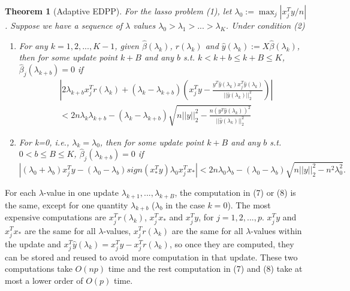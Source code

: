 \documentclass{article}
\newtheorem{theorem}{Theorem}[section]
\begin{document}
\begin{theorem}[Adaptive EDPP]
    For the lasso problem (1), let $\lambda_0:=\max_j|x_j^Ty/n|$. Suppose we have a sequence of $\lambda$ values $\lambda_0>\lambda_1>...>\lambda_K$. Under condition (2)
    \begin{enumerate}
        \item For any $k=1,2,...,K-1$, given $\hat{\beta}(\lambda_k)$, $r(\lambda_k)$ and $\hat{y}(\lambda_k):=X\hat{\beta}(\lambda_k)$, then for some update point $k+B$ and any $b$ s.t. $k<k+b\leq k+B\leq K$, $\hat{\beta}_j(\lambda_{k+b})=0$ if
        \begin{equation}
            \begin{split}
                &\left|2\lambda_{k+b}x_j^Tr(\lambda_k)+(\lambda_k-\lambda_{k+b})\left( x_j^Ty-\frac{y^T\hat{y}(\lambda_k)x_j^T\hat{y}(\lambda_k)}{||\hat{y}(\lambda_k)||_2^2}\right)\right|\\&<2n\lambda_k\lambda_{k+b}-(\lambda_k-\lambda_{k+b})\sqrt{n||y||_2^2-\frac{n(y^T\hat{y}(\lambda_k))^2}{||\hat{y}(\lambda_k)||_2^2}}
            \end{split}
        \end{equation}
        \item For k=0, i.e., $\lambda_k=\lambda_0$, then for some update point $k+B$ and any $b$ s.t. $0<b\leq B\leq K$, $\hat{\beta}_j(\lambda_{k+b})=0$ if
        \begin{equation}
        |(\lambda_0+\lambda_b)x_j^Ty-(\lambda_0-\lambda_b)sign(x_*^Ty)\lambda_0x_j^Tx_*|<2n\lambda_0\lambda_b-(\lambda_0-\lambda_b)\sqrt{n||y||_2^2-n^2\lambda_0^2}.
    \end{equation}
    \end{enumerate}
\end{theorem}

For each $\lambda$-value in one update $\lambda_{k+1},...,\lambda_{k+B}$, the computation in (7) or (8) is the same, except for one quantity $\lambda_{k+b}$ ($\lambda_b$ in the case $k=0$). The most expensive computations are $x_j^Tr(\lambda_k)$, $x_j^Tx_*$ and $x_j^Ty$, for $j=1,2,...,p$. $x_j^Ty$ and $x_j^Tx_*$ are the same for all $\lambda$-values, $x_j^Tr(\lambda_k)$ are the same for all $\lambda$-values within the update and $x_j^T\hat{y}(\lambda_k)=x_j^Ty-x_j^Tr(\lambda_k)$, so once they are computed, they can be stored and reused to avoid more computation in that update. These two computations take $O(np)$ time and the rest computation in (7) and (8) take at most a lower order of $O(p)$ time.
\end{document}
